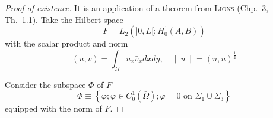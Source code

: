 \documentclass[a4paper,12pt,leqno]{article}
\numberwithin{equation}{section}
\begin{document}
\begin{proof}[Proof of existence]
	
	It is an application of a theorem from \textsc{Lions} \cite{zbMATH03160590} (Chp.~3, Th.~1.1).
	Take the Hilbert space
	\begin{equation*}
		F=L_{2}(] 0, L[; H_{0}^{1}(A, B))
	\end{equation*}
	with the scalar product and norm
	\begin{equation*}
		(u, v)=\int_{\Omega} u_{x} \bar{v}_{x} d x d y, \quad\|u\|=(u, u)^{\frac 1 2}
	\end{equation*}

	\newpage

	Consider the subspace $\Phi$ of $F$
	\begin{equation*}
		\Phi \equiv\left\{\varphi; \varphi \in C_{0}^{1}(\bar{\Omega}); \varphi=0 \text { on } \Sigma_{1} \cup \Sigma_{3}\right\}
	\end{equation*}
	equipped with the norm of $F$.
	

\end{proof}
\end{document}
